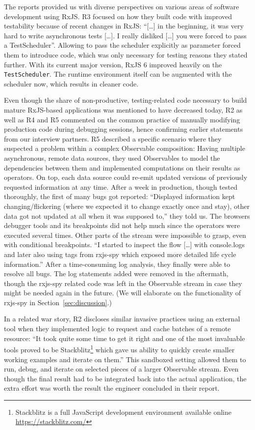 \documentclass[12pt,a4paper]{article}
\begin{document}
The reports provided us with diverse perspectives on various areas of software development using RxJS. R3 focused on how they built code with improved testability because of recent changes in RxJS: ``[\dots] in the beginning, it was very hard to write asynchronous tests [\dots]. I really disliked [\dots] you were forced to pass a TestScheduler''. Allowing to pass the scheduler explicitly as parameter forced them to introduce code, which was only necessary for testing reasons they stated further. With its current major version, RxJS 6 improved heavily on the  \texttt{TestScheduler}. The runtime environment itself can be augmented with the scheduler now, which results in cleaner code.

Even though the share of non-productive, testing-related code necessary to build mature RxJS-based applications was mentioned to have decreased today, R2 as well as R4 and R5 commented on the common practice of manually modifying production code during debugging sessions, hence confirming earlier statements from our interview partners. R5 described a specific scenario where they suspected a problem within a complex Observable composition: Having multiple asynchronous, remote data sources, they used Observables to model the dependencies between them and implemented computations on their results as operators. On top, each data source could re-emit updated versions of previously requested information at any time. After a week in production, though tested thoroughly, the first of many bugs got reported: ``Displayed information kept changing/flickering (where we expected it to change exactly once and stay), other data got not updated at all when it was supposed to,'' they told us. The browsers debugger tools and its breakpoints did not help much since the operators were executed several times. Other parts of the stream were impossible to grasp, even with conditional breakpoints. ``I started to inspect the flow [\dots] with console.logs and later also using tags from rxjs-spy which exposed more detailed life cycle information.'' After a time-consuming log analysis, they finally were able to resolve all bugs. The log statements added were removed in the aftermath, though the rxjs-spy related code was left in the Observable stream in case they might be needed again in the future. (We will elaborate on the functionality of rxjs-spy in Section~\ref{sec:discussion}.)

In a related war story, R2 discloses similar invasive practices using an external tool when they implemented logic to request and cache batches of a remote resource: ``It took quite some time to get it right and one of the most invaluable tools proved to be Stackblitz\footnote{Stackblitz is a full JavaScript development environment available online \url{https://stackblitz.com/}} which gave us ability to quickly create smaller working examples and iterate on them.'' This sandboxed setting allowed them to run, debug, and iterate on selected pieces of a larger Observable stream. Even though the final result had to be integrated back into the actual application, the extra effort was worth the result the engineer concluded in their report.
\end{document}
